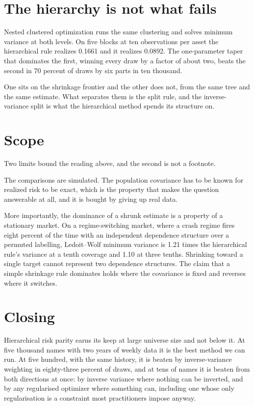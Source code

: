 \documentclass[11pt]{article}
\begin{document}
\section{The hierarchy is not what fails}

Nested clustered optimization runs the same clustering and solves minimum
variance at both levels. On five blocks at ten observations per asset the
hierarchical rule realizes 0.1661 and it realizes 0.0892. The one-parameter
taper that dominates the first, winning every draw by a factor of about two,
beats the second in 70 percent of draws by six parts in ten thousand.

One sits on the shrinkage frontier and the other does not, from the same tree
and the same estimate. What separates them is the split rule, and the
inverse-variance split is what the hierarchical method spends its structure
on.

\section{Scope}

Two limits bound the reading above, and the second is not a footnote.

The comparisons are simulated. The population covariance has to be known for
realized risk to be exact, which is the property that makes the question
answerable at all, and it is bought by giving up real data.

More importantly, the dominance of a shrunk estimate is a property of a
stationary market. On a regime-switching market, where a crash regime fires
eight percent of the time with an independent dependence structure over a
permuted labelling, Ledoit--Wolf minimum variance is 1.21 times the
hierarchical rule's variance at a tenth coverage and 1.10 at three tenths.
Shrinking toward a single target cannot represent two dependence structures.
The claim that a simple shrinkage rule dominates holds where the covariance
is fixed and reverses where it switches.

\section{Closing}

Hierarchical risk parity earns its keep at large universe size and not below
it. At five thousand names with two years of weekly data it is the best
method we can run. At five hundred, with the same history, it is beaten by
inverse-variance weighting in eighty-three percent of draws, and at tens of
names it is beaten from both directions at once: by inverse variance where
nothing can be inverted, and by any regularised optimizer where something
can, including one whose only regularisation is a constraint most
practitioners impose anyway.
\end{document}
